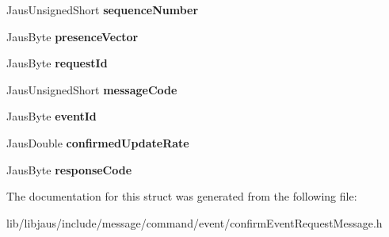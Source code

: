 \begin{DoxyCompactItemize}
\item 
\hypertarget{struct_confirm_event_request_message_struct_a3bfed1e383eae0d82d97bd1de815f189}{\-Jaus\-Unsigned\-Short {\bfseries sequence\-Number}}\label{struct_confirm_event_request_message_struct_a3bfed1e383eae0d82d97bd1de815f189}

\item 
\hypertarget{struct_confirm_event_request_message_struct_a9cc071b48f7a922f9b037b7d7fa3f9d2}{\-Jaus\-Byte {\bfseries presence\-Vector}}\label{struct_confirm_event_request_message_struct_a9cc071b48f7a922f9b037b7d7fa3f9d2}

\item 
\hypertarget{struct_confirm_event_request_message_struct_af1aa416796b8cbe119b4a262237ce2d7}{\-Jaus\-Byte {\bfseries request\-Id}}\label{struct_confirm_event_request_message_struct_af1aa416796b8cbe119b4a262237ce2d7}

\item 
\hypertarget{struct_confirm_event_request_message_struct_a9a9523064230d3022113ffdbdfa73586}{\-Jaus\-Unsigned\-Short {\bfseries message\-Code}}\label{struct_confirm_event_request_message_struct_a9a9523064230d3022113ffdbdfa73586}

\item 
\hypertarget{struct_confirm_event_request_message_struct_abb3ea7132c86138c4f6c5aa5bcc0083f}{\-Jaus\-Byte {\bfseries event\-Id}}\label{struct_confirm_event_request_message_struct_abb3ea7132c86138c4f6c5aa5bcc0083f}

\item 
\hypertarget{struct_confirm_event_request_message_struct_aebeed17b88e46ede88445ac0d598ebcf}{\-Jaus\-Double {\bfseries confirmed\-Update\-Rate}}\label{struct_confirm_event_request_message_struct_aebeed17b88e46ede88445ac0d598ebcf}

\item 
\hypertarget{struct_confirm_event_request_message_struct_a6386fd73cff0fd3afbe1d0d310233f0a}{\-Jaus\-Byte {\bfseries response\-Code}}\label{struct_confirm_event_request_message_struct_a6386fd73cff0fd3afbe1d0d310233f0a}

\end{DoxyCompactItemize}


\-The documentation for this struct was generated from the following file\-:\begin{DoxyCompactItemize}
\item 
lib/libjaus/include/message/command/event/confirm\-Event\-Request\-Message.\-h\end{DoxyCompactItemize}
